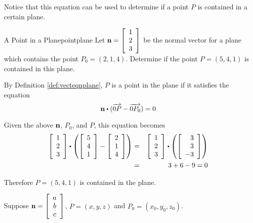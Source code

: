Notice that this equation can be used to determine if a point $P$ is contained in a certain plane. 

\begin{example}{A Point in a Plane}{pointplane}
Let ${\bf n} = 
\left[
\begin{array}{r}
1 \\
2 \\
3 
\end{array}
\right]$ be the normal vector for a plane which contains the point $P_0 = \left( 2, 1, 4 \right)$. Determine if the point $P = \left( 5, 4, 1 \right)$ is contained in this plane. 
\end{example}

\begin{solution}
By Definition \ref{def:vecteqnplane}, $P$ is a point in the plane if it satisfies the equation
\[
\vect{n} \dotprod (\longvect{0P} - \longvect{0P_0}) = 0
\]

Given the above ${\bf n}$, $P_0$, and $P$, this equation becomes
\begin{eqnarray*}
\leftB
\begin{array}{r}
1 \\
2 \\
3
\end{array}
\rightB
\dotprod
\left(
\leftB
\begin{array}{r}
5 \\
4 \\
1
\end{array}
\rightB
-
\leftB
\begin{array}{r}
2 \\
1 \\
4
\end{array}
\rightB
\right)
&=& 
\leftB
\begin{array}{r}
1 \\
2 \\
3
\end{array}
\rightB
\dotprod
\left(
\leftB
\begin{array}{r}
3 \\
3 \\
-3
\end{array}
\rightB
\right) \\
&=& 
3 + 6 - 9 = 0
\end{eqnarray*}

Therefore $P = ( 5, 4, 1)$ is contained in the plane.

\end{solution}

Suppose ${\bf n} = \left[
\begin{array}{c}
a \\
b \\
c
\end{array}
\right]$, $P = \left( x,y,z\right)$ and $P_0 = (x_0, y_0, z_0 )$.

